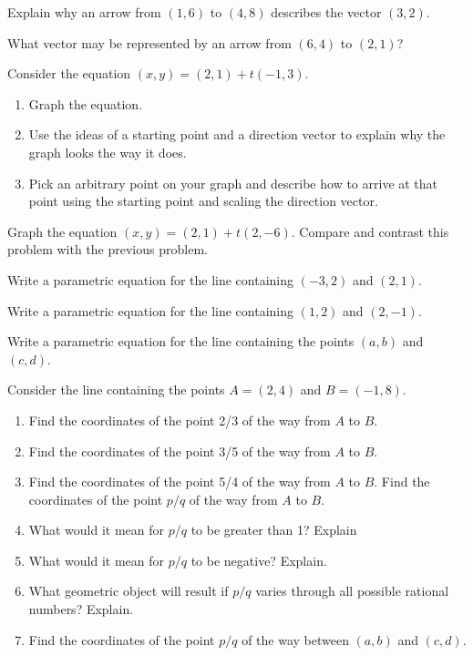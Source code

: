 \begin{prob}
Explain why an arrow from $(1,6)$ to $(4,8)$ describes the vector $(3,2)$.  
\end{prob}

\begin{prob}
What vector may be represented by an arrow from $(6,4)$ to $(2,1)$?  
\end{prob}

\begin{prob} Consider the equation $(x,y)=(2,1)+t(-1,3)$.  
\begin{enumerate} 
\item Graph the equation.  
\item Use the ideas of a starting point and a direction vector to explain why the graph looks the way it does.   
\item Pick an arbitrary point on your graph and describe how to arrive at that point using the starting point and scaling the direction vector.  
\end{enumerate}
\end{prob}
\begin{prob}  Graph the equation $(x,y) = (2,1) + t(2,-6)$.  Compare and contrast this problem with the previous problem.  
\end{prob}
\begin{prob}  Write a parametric equation for the line containing $(-3, 2)$ and $(2, 1)$.  
\end{prob}
\begin{prob}  Write a parametric equation for the line containing $(1, 2)$ and $(2, -1)$.

\end{prob}
\begin{prob} Write a parametric equation for the line containing the points $(a,b)$ and $(c,d)$.  

\end{prob}
\begin{prob}  Consider the line containing the points $A=(2, 4)$ and $B=(-1, 8)$.
\begin{enumerate}
\item Find the coordinates of the point 2/3 of the way from $A$ to $B$.  
\item Find the coordinates of the point 3/5 of the way from $A$ to $B$.
\item Find the coordinates of the point 5/4 of the way from $A$ to $B$.  
Find the coordinates of the point $p/q$ of the way from $A$ to $B$.  
\item What would it mean for $p/q$ to be greater than 1?  Explain
\item What would it mean for $p/q$ to be negative?  Explain.  
\item What geometric object will result if $p/q$ varies through all possible rational numbers?  Explain.   
\item  Find the coordinates of the point $p/q$ of the way between $(a, b)$ and $(c, d)$.  
\end{enumerate}

\end{prob}
